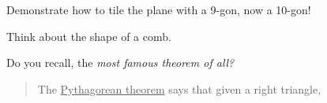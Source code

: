 \documentclass[noauthor,nooutcomes,handout,hints]{ximera}
\begin{document}
\begin{question}
  Demonstrate how to tile the plane with a 9-gon, now a 10-gon!

  \begin{hint}
    Think about the shape of a comb.
  \end{hint}  
\end{question}
\mynewpage



\begin{question}
  Do you recall, the \textit{most famous theorem of all?}
    \begin{mdframed}[style=OutcomeStyle]\begin{quote}
    The \underline{Pythagorean theorem} says that given a right
    triangle,
    \begin{center}
\end{center}
\end{quote}
\end{mdframed}
\end{question}
\end{document}

